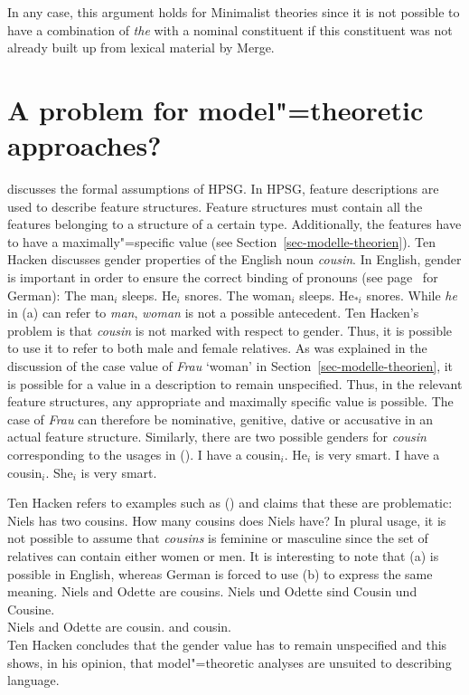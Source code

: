 In any case, this argument holds for Minimalist theories since it is not possible to have a combination
of \emph{the} with a nominal constituent if this constituent was not already built up from lexical
material by Merge.

\section{A problem for model"=theoretic approaches?}
\label{Abschnitt-MTS-ten-Hacken}

\mbox{} discusses the formal assumptions of HPSG\indexhpsg. In HPSG, feature descriptions are used to describe feature
structures. Feature structures must contain all the features belonging to a structure of a certain
type. Additionally, the features have to have a maximally"=specific value (see
Section~\ref{sec-modelle-theorien}). Ten Hacken discusses gender properties of the
English noun \emph{cousin}. In English, gender is important in order to ensure the correct binding
of pronouns (see page~\pageref{le-buch} for German): 
\eal
\ex The man$_i$ sleeps. He$_i$ snores.
\ex The woman$_i$ sleeps. He$_{*i}$ snores.
\zl
While \emph{he} in (a) can refer to \emph{man}, \emph{woman} is not a possible antecedent. Ten Hacken's problem is that \emph{cousin}
is not marked with respect to gender. Thus, it is possible to use it to refer to both male and female relatives.
As was explained in the discussion of the case value of \emph{Frau} `woman' in Section~\ref{sec-modelle-theorien}, it is possible for a
value in a description to remain unspecified. Thus, in the relevant feature structures, any
appropriate and maximally specific value is possible. The case of \emph{Frau} can therefore be nominative, genitive, dative or accusative in an actual feature structure.
Similarly, there are two possible genders for \emph{cousin} corresponding to the usages in ().
\eal
\ex I have a cousin$_i$. He$_i$ is very smart.
\ex I have a cousin$_i$. She$_i$ is very smart.
\zl

\noindent
Ten Hacken refers to examples such as () and claims that these are problematic:
\eal
\ex Niels has two cousins.
\ex How many cousins does Niels have?
\zl
In plural usage, it is not possible to assume that \emph{cousins} is feminine or masculine since the set of relatives can contain
either women or men. It is interesting to note that (a) is possible in English, whereas German is forced to use (b)
to express the same meaning.
\eal
\ex Niels and Odette are cousins.
\ex 
\gll Niels und Odette sind Cousin und Cousine.\\
	 Niels and Odette are cousin.\mas{} and cousin.\fem\\
\zl
Ten Hacken concludes that the gender value has to remain unspecified and this shows, in his opinion, that model"=theoretic analyses
are unsuited to describing language.

